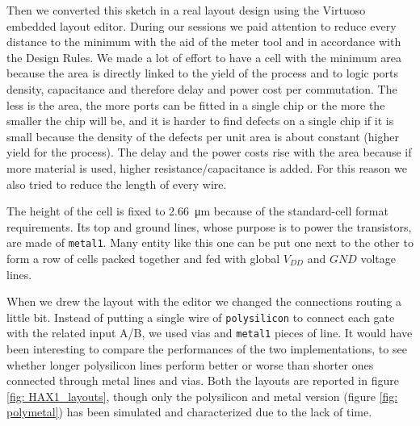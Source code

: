 \documentclass[a4paper]{article}
\begin{document}
Then we converted this sketch in a real layout design using the Virtuoso embedded layout editor. During our sessions we paid attention to reduce every distance to the minimum with the aid of the meter tool and in accordance with the Design Rules. We made a lot of effort to have a cell with the minimum area because the area is directly linked to the yield of the process and to logic ports density, capacitance and therefore delay and power cost per commutation. The less is the area, the more ports can be fitted in a single chip or the more the smaller the chip will be, and it is harder to find defects on a single chip if it is small because the density of the defects per unit area is about constant (higher yield for the process). The delay and the power costs rise with the area because if more material is used, higher resistance/capacitance is added. For this reason we also tried to reduce the length of every wire.

The height of the cell is fixed to \SI{2.66}{\micro\meter} because of the standard-cell format requirements. Its top and ground lines, whose purpose is to power the transistors, are made of \texttt{metal1}. Many entity like this one can be put one next to the other to form a row of cells packed together and fed with global $V_{DD}$ and $GND$ voltage lines.

When we drew the layout with the editor we changed the connections routing a little bit. Instead of putting a single wire of \texttt{polysilicon} to connect each gate with the related input A/B, we used vias and \texttt{metal1} pieces of line. It would have been interesting to compare the performances of the two implementations, to see whether longer polysilicon lines perform better or worse than shorter ones connected through metal lines and vias. Both the layouts are reported in figure \ref{fig: HAX1_layouts}, though only the polysilicon and metal version (figure \ref{fig: polymetal}) has been simulated and characterized due to the lack of time.
\end{document}

